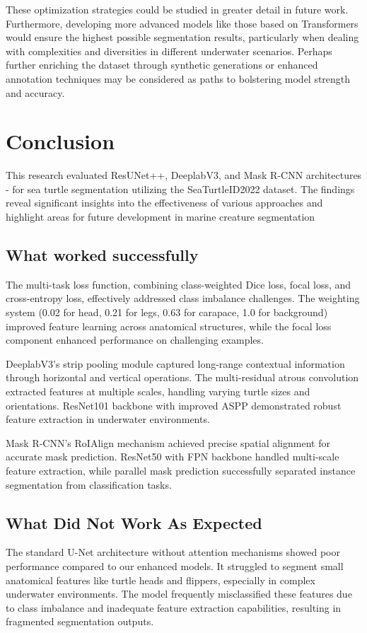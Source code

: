 \documentclass[conference]{IEEEtran}
\begin{document}
These optimization strategies could be studied in greater detail in future work. Furthermore, developing more advanced models like those based on Transformers would ensure the highest possible segmentation results, particularly when dealing with complexities and diversities in different underwater scenarios. Perhaps further enriching the dataset through synthetic generations or enhanced annotation techniques may be considered as paths to bolstering model strength and accuracy.
\section{Conclusion}
This research evaluated ResUNet++, DeeplabV3, and Mask R-CNN architectures - for sea turtle segmentation utilizing the SeaTurtleID2022 dataset. The findings reveal significant insights into the effectiveness of various approaches and highlight areas for future development in marine creature segmentation
\subsection{What worked successfully}
The multi-task loss function, combining class-weighted Dice loss, focal loss, and cross-entropy loss, effectively addressed class imbalance challenges. The weighting system (0.02 for head, 0.21 for legs, 0.63 for carapace, 1.0 for background) improved feature learning across anatomical structures, while the focal loss component enhanced performance on challenging examples.

DeeplabV3's strip pooling module captured long-range contextual information through horizontal and vertical operations. The multi-residual atrous convolution extracted features at multiple scales, handling varying turtle sizes and orientations. ResNet101 backbone with improved ASPP demonstrated robust feature extraction in underwater environments.

Mask R-CNN's RoIAlign mechanism achieved precise spatial alignment for accurate mask prediction. ResNet50 with FPN backbone handled multi-scale feature extraction, while parallel mask prediction successfully separated instance segmentation from classification tasks.
\subsection{What Did Not Work As Expected}
The standard U-Net architecture without attention mechanisms showed poor performance compared to our enhanced models. It struggled to segment small anatomical features like turtle heads and flippers, especially in complex underwater environments. The model frequently misclassified these features due to class imbalance and inadequate feature extraction capabilities, resulting in fragmented segmentation outputs.
\end{document}
